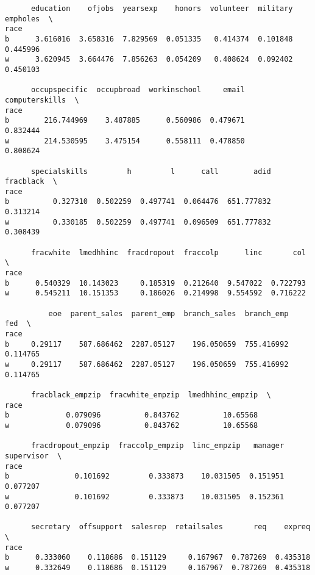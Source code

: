 \documentclass[11pt]{article}
\begin{document}
    
    \begin{verbatim}
      education    ofjobs  yearsexp    honors  volunteer  military  empholes  \
race                                                                           
b      3.616016  3.658316  7.829569  0.051335   0.414374  0.101848  0.445996   
w      3.620945  3.664476  7.856263  0.054209   0.408624  0.092402  0.450103   

      occupspecific  occupbroad  workinschool     email  computerskills  \
race                                                                      
b        216.744969    3.487885      0.560986  0.479671        0.832444   
w        214.530595    3.475154      0.558111  0.478850        0.808624   

      specialskills         h         l      call        adid  fracblack  \
race                                                                       
b          0.327310  0.502259  0.497741  0.064476  651.777832   0.313214   
w          0.330185  0.502259  0.497741  0.096509  651.777832   0.308439   

      fracwhite  lmedhhinc  fracdropout  fraccolp      linc       col  \
race                                                                    
b      0.540329  10.143023     0.185319  0.212640  9.547022  0.722793   
w      0.545211  10.151353     0.186026  0.214998  9.554592  0.716222   

          eoe  parent_sales  parent_emp  branch_sales  branch_emp       fed  \
race                                                                          
b     0.29117    587.686462  2287.05127    196.050659  755.416992  0.114765   
w     0.29117    587.686462  2287.05127    196.050659  755.416992  0.114765   

      fracblack_empzip  fracwhite_empzip  lmedhhinc_empzip  \
race                                                         
b             0.079096          0.843762          10.65568   
w             0.079096          0.843762          10.65568   

      fracdropout_empzip  fraccolp_empzip  linc_empzip   manager  supervisor  \
race                                                                           
b               0.101692         0.333873    10.031505  0.151951    0.077207   
w               0.101692         0.333873    10.031505  0.152361    0.077207   

      secretary  offsupport  salesrep  retailsales       req    expreq  \
race                                                                     
b      0.333060    0.118686  0.151129     0.167967  0.787269  0.435318   
w      0.332649    0.118686  0.151129     0.167967  0.787269  0.435318   


\end{verbatim}
\end{document}
